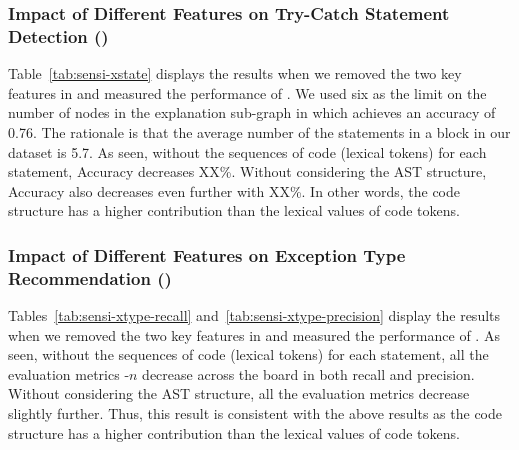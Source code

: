 \subsubsection{Impact of Different Features on Try-Catch Statement Detection ({\xstate})}

Table~\ref{tab:sensi-xstate} displays the results when we removed the
two key features in {\tool} and measured the performance of {\xstate}.
We used six as the limit on the number of nodes in the explanation
sub-graph in which {\tool} achieves an accuracy of 0.76. The rationale
is that the average number of the statements in a 
block in our dataset is 5.7. As seen, without the sequences of code
(lexical tokens) for each statement, Accuracy decreases XX\%. Without
considering the AST structure, Accuracy also decreases even further
with XX\%. In other words, the code structure has a higher
contribution than the lexical values of code tokens.

\subsubsection{Impact of Different Features on Exception Type Recommendation ({\xtype})}

Tables~\ref{tab:sensi-xtype-recall}
and~\ref{tab:sensi-xtype-precision} display the results when we
removed the two key features in {\tool} and measured the performance
of {\xtype}. As seen, without the sequences of code (lexical tokens)
for each statement, all the evaluation metrics -$n$ decrease
across the board in both recall and precision. Without considering the
AST structure, all the evaluation metrics decrease slightly further.
Thus, this result is consistent with the above results as the code
structure has a higher contribution than the lexical values of code
tokens.

